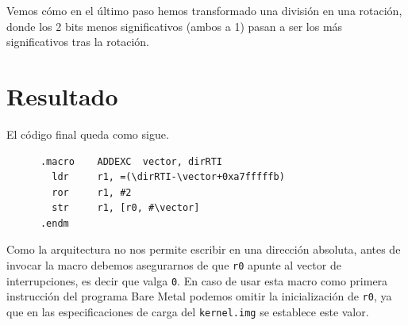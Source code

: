 Vemos cómo en el último paso hemos transformado una división en una rotación, donde los
2 bits menos significativos (ambos a 1) pasan a ser los más significativos tras la
rotación.

\section{Resultado}

El código final queda como sigue.

\begin{lstlisting}
      .macro    ADDEXC  vector, dirRTI
        ldr     r1, =(\dirRTI-\vector+0xa7fffffb)
        ror     r1, #2
        str     r1, [r0, #\vector]
      .endm
\end{lstlisting}

Como la arquitectura no nos permite escribir en una dirección absoluta, antes
de invocar la macro debemos asegurarnos de que {\tt r0} apunte al vector de
interrupciones, es decir que valga {\tt 0}. En caso de usar esta macro como
primera instrucción del programa Bare Metal podemos omitir la inicialización
de {\tt r0}, ya que en las especificaciones de carga del {\tt kernel.img} se
establece este valor.

\chapterend
